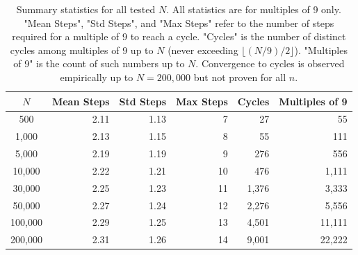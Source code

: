 \documentclass[12pt]{article}
\begin{document}
\begin{table}[ht]
    \centering
    \small
    \setlength{\tabcolsep}{4pt}
    \renewcommand{\arraystretch}{1.1}
    \begin{tabular}{|c|r|r|r|r|r|}
        \hline
        $N$ & Mean Steps & Std Steps & Max Steps & Cycles & Multiples of 9 \\
        \hline
        500 & 2.11 & 1.13 & 7 & 27 & 55 \\
        1,000 & 2.13 & 1.15 & 8 & 55 & 111 \\
        5,000 & 2.19 & 1.19 & 9 & 276 & 556 \\
        10,000 & 2.22 & 1.21 & 10 & 476 & 1,111 \\
        30,000 & 2.25 & 1.23 & 11 & 1,376 & 3,333 \\
        50,000 & 2.27 & 1.24 & 12 & 2,276 & 5,556 \\
        100,000 & 2.29 & 1.25 & 13 & 4,501 & 11,111 \\
        200,000 & 2.31 & 1.26 & 14 & 9,001 & 22,222 \\
        \hline
    \end{tabular}
    \caption{Summary statistics for all tested $N$. All statistics are for multiples of 9 only. "Mean Steps", "Std Steps", and "Max Steps" refer to the number of steps required for a multiple of 9 to reach a cycle. "Cycles" is the number of distinct cycles among multiples of 9 up to $N$ (never exceeding $\lfloor (N/9)/2 \rfloor$). "Multiples of 9" is the count of such numbers up to $N$. Convergence to cycles is observed empirically up to $N=200,000$ but not proven for all $n$.}
    \label{tab:summary_stats}
\end{table}
\end{document}
